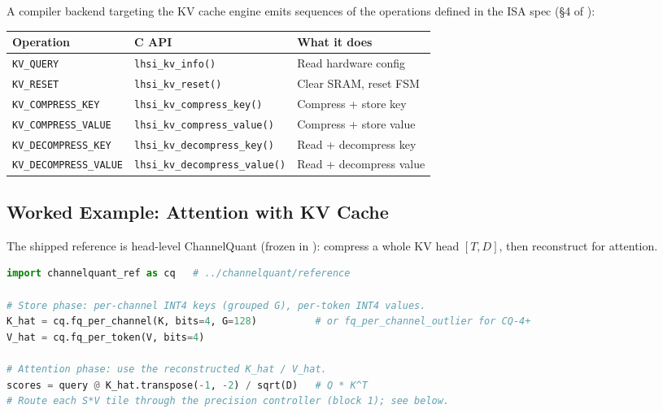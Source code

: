 \documentclass[11pt]{article}
\begin{document}
A compiler backend targeting the KV cache engine emits sequences of
the operations defined in the ISA spec (\S4 of
):

\begin{table}[h]
\centering
\small
\begin{tabular}{@{}l l p{6cm}@{}}
\toprule
Operation & C API & What it does \\
\midrule
\texttt{KV\_QUERY} & \texttt{lhsi\_kv\_info()} & Read hardware config \\
\texttt{KV\_RESET} & \texttt{lhsi\_kv\_reset()} & Clear SRAM, reset FSM \\
\texttt{KV\_COMPRESS\_KEY} & \texttt{lhsi\_kv\_compress\_key()} & Compress + store key \\
\texttt{KV\_COMPRESS\_VALUE} & \texttt{lhsi\_kv\_compress\_value()} & Compress + store value \\
\texttt{KV\_DECOMPRESS\_KEY} & \texttt{lhsi\_kv\_decompress\_key()} & Read + decompress key \\
\texttt{KV\_DECOMPRESS\_VALUE} & \texttt{lhsi\_kv\_decompress\_value()} & Read + decompress value \\
\bottomrule
\end{tabular}
\end{table}

\subsection{Worked Example: Attention with KV Cache}

The shipped reference is head-level ChannelQuant (frozen in ):
compress a whole KV head $[T, D]$, then reconstruct for attention.

\begin{lstlisting}[language=Python]
import channelquant_ref as cq   # ../channelquant/reference

# Store phase: per-channel INT4 keys (grouped G), per-token INT4 values.
K_hat = cq.fq_per_channel(K, bits=4, G=128)          # or fq_per_channel_outlier for CQ-4+
V_hat = cq.fq_per_token(V, bits=4)

# Attention phase: use the reconstructed K_hat / V_hat.
scores = query @ K_hat.transpose(-1, -2) / sqrt(D)   # Q * K^T
# Route each S*V tile through the precision controller (block 1); see below.
\end{lstlisting}

\end{document}
